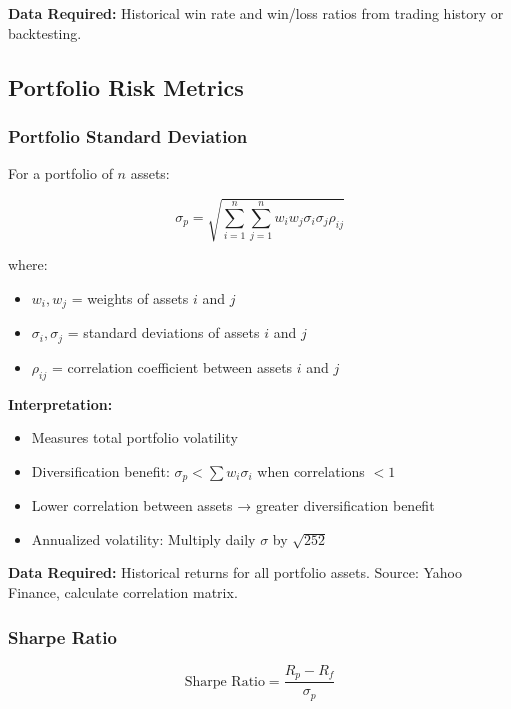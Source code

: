 \documentclass[11pt,a4paper]{article}
\begin{document}
\textbf{Data Required:} Historical win rate and win/loss ratios from trading history or backtesting.

\subsection{Portfolio Risk Metrics}

\subsubsection{Portfolio Standard Deviation}

For a portfolio of $n$ assets:

\begin{equation}
\sigma_p = \sqrt{\sum_{i=1}^{n}\sum_{j=1}^{n} w_i w_j \sigma_i \sigma_j \rho_{ij}}
\end{equation}

where:
\begin{itemize}
    \item $w_i, w_j$ = weights of assets $i$ and $j$
    \item $\sigma_i, \sigma_j$ = standard deviations of assets $i$ and $j$
    \item $\rho_{ij}$ = correlation coefficient between assets $i$ and $j$
\end{itemize}

\textbf{Interpretation:}
\begin{itemize}
    \item Measures total portfolio volatility
    \item Diversification benefit: $\sigma_p < \sum w_i \sigma_i$ when correlations $< 1$
    \item Lower correlation between assets → greater diversification benefit
    \item Annualized volatility: Multiply daily $\sigma$ by $\sqrt{252}$
\end{itemize}

\textbf{Data Required:} Historical returns for all portfolio assets. Source: Yahoo Finance, calculate correlation matrix.

\subsubsection{Sharpe Ratio}

\begin{equation}
\text{Sharpe Ratio} = \frac{R_p - R_f}{\sigma_p}
\end{equation}
\end{document}
